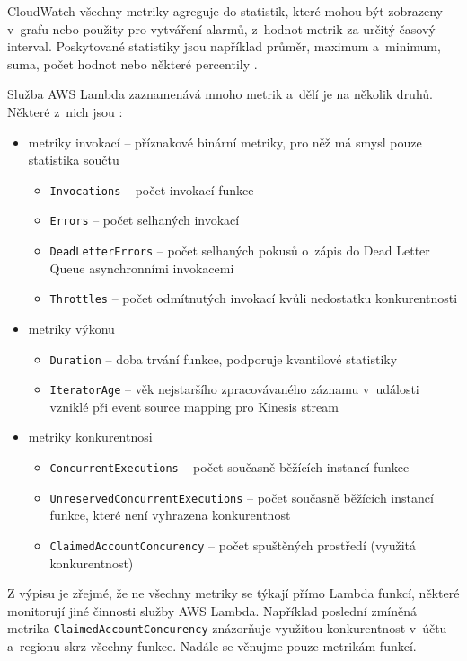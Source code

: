 \documentclass[czech, ing, kiv, he, iso690]{fasthesis}
\begin{document}
CloudWatch všechny metriky agreguje do statistik, které mohou být zobrazeny v~grafu nebo použity pro vytváření alarmů, z~hodnot metrik za určitý časový interval. Poskytované statistiky jsou například průměr, maximum a~minimum, suma, počet hodnot nebo některé percentily \cite{cloudwatch.docs.aws}.

Služba AWS Lambda zaznamenává mnoho metrik a~dělí je na několik druhů. Některé z~nich jsou \cite{lambda.docs.aws}:

\begin{itemize}
    \item metriky invokací -- příznakové binární metriky, pro něž má smysl pouze statistika součtu
    \begin{itemize}
        \item \texttt{Invocations} -- počet invokací funkce
        \item \texttt{Errors} -- počet selhaných invokací
        \item \texttt{DeadLetterErrors} -- počet selhaných pokusů o~zápis do Dead Letter Queue asynchronními invokacemi
        \item \texttt{Throttles} -- počet odmítnutých invokací kvůli nedostatku konkurentnosti
    \end{itemize}
    \item metriky výkonu
    \begin{itemize}
        \item \texttt{Duration} -- doba trvání funkce, podporuje kvantilové statistiky
        \item \texttt{IteratorAge} -- věk nejstaršího zpracovávaného záznamu v~události vzniklé při event source mapping pro Kinesis stream
    \end{itemize}
    \item metriky konkurentnosi
    \begin{itemize}
        \item \texttt{ConcurrentExecutions} -- počet současně běžících instancí funkce
        \item \texttt{UnreservedConcurrentExecutions} -- počet současně běžících instancí funkce, které není vyhrazena konkurentnost
        \item \texttt{ClaimedAccountConcurency} -- počet spuštěných prostředí (využitá konkurentnost)
    \end{itemize}
\end{itemize}

Z výpisu je zřejmé, že ne všechny metriky se týkají přímo Lambda funkcí, některé monitorují jiné činnosti služby AWS Lambda. Například poslední zmíněná metrika \texttt{ClaimedAccountConcurency} znázorňuje využitou konkurentnost v~účtu a~regionu skrz všechny funkce. Nadále se věnujme pouze metrikám funkcí.
\end{document}
